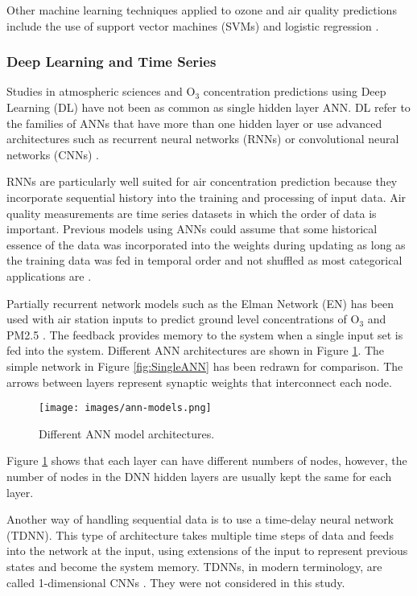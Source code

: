 Other machine learning techniques applied to ozone and air quality predictions include the use of support vector machines (SVMs) \citep{Luna2014, Papaleonidas2013, Singh2013} and logistic regression \citep{Zickus2002}. 

\subsubsection{Deep Learning and Time Series}
Studies in atmospheric sciences and O$_{3}$ concentration predictions using Deep Learning (DL) have not been as common as single hidden layer ANN. DL refer to the families of ANNs that have more than one hidden layer or use advanced architectures such as recurrent neural networks (RNNs) or convolutional neural networks (CNNs) \citep{Goodfellow2016}. 

RNNs are particularly well suited for air concentration prediction because they incorporate sequential history into the training and processing of input data. Air quality measurements are time series datasets in which the order of data is important. Previous models using ANNs could assume that some historical essence of the data was incorporated into the weights during updating as long as the training data was fed in temporal order and not shuffled as most categorical applications are \citep{Bengio2012}.

Partially recurrent network models such as the Elman Network (EN) has been used  with air station inputs to predict ground level concentrations of O$_{3}$ \citep{Biancofiore2015} and PM2.5 \citep{Biancofiore2017}. The feedback provides memory to the system when a single input set is fed into the system. Different ANN architectures are shown in Figure \ref{fig:ANNmodels}. The simple network in Figure \ref{fig:SingleANN} has been redrawn for comparison.  The arrows between layers represent synaptic weights that interconnect each node.
%
\begin{figure}
\centering
\texttt{[image: images/ann-models.png]} 
\caption{Different ANN model architectures.}
\label{fig:ANNmodels}
\end{figure}
%
Figure \ref{fig:ANNmodels} shows that each layer can have different numbers of nodes, however, the number of nodes in the DNN hidden layers are usually kept the same for each layer. 

Another way of handling sequential data is to use a time-delay neural network (TDNN). This type of architecture takes multiple time steps of data and feeds into the network at the input, using extensions of the input to represent previous states and become the system memory. TDNNs, in modern terminology, are called 1-dimensional CNNs \citep{Goodfellow2016}. They were not considered in this study.

